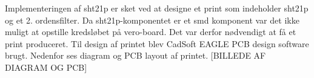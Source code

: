 Implementeringen af sht21p er sket ved at designe et print som indeholder sht21p og et 2. ordensfilter. 
Da sht21p-komponentet er et smd komponent var det ikke muligt at opstille kredsløbet på vero-board. Det var derfor nødvendigt at få et print produceret. Til design af printet blev CadSoft EAGLE PCB design software brugt. Nedenfor ses diagram og PCB layout af printet.
[BILLEDE AF DIAGRAM  OG PCB]

